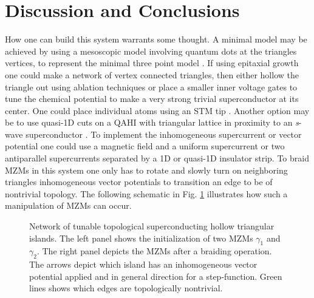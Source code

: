 \documentclass[aps,prb,showpacs,amsmath,amssymb,superscriptaddress]{revtex4-2}
\begin{document}
\section{Discussion and Conclusions}

How one can build this system warrants some thought.
A minimal model may be achieved by using a mesoscopic model involving quantum dots at the triangles vertices, to represent the minimal three point model \cite{dvirRealizationMinimalKitaev2023}.
If using epitaxial growth \cite{pietzschSpinResolvedElectronicStructure2006} one could make a network of vertex connected triangles, then either hollow the triangle out using ablation techniques or place a smaller inner voltage gates to tune the chemical potential to make a very strong trivial superconductor at its center.
One could place individual atoms using an STM tip \cite{schneiderPrecursorsMajoranaModes2022}.
Another option may be to use quasi-1D cuts on a QAHI with triangular lattice in proximity to an \textit{s}-wave superconductor \cite{xieCreatingLocalizedMajorana2021}.
To implement the inhomogeneous supercurrent or vector potential one could use a magnetic field and a uniform supercurrent or two antiparallel supercurrents separated by a 1D or quasi-1D insulator strip.
To braid MZMs in this system one only has to rotate and slowly turn on neighboring triangles inhomogeneous vector potentials to transition an edge to be of nontrivial topology.
The following schematic in Fig. \ref{fig: triangular-network-braiding} illustrates how such a manipulation of MZMs can occur.

\begin{figure}[]
  \caption{Network of tunable topological superconducting hollow triangular islands. The left panel shows the initialization of two MZMs $\gamma_1$ and $\gamma_2$. The right panel depicts the MZMs after a braiding operation. The arrows depict which island has an inhomogeneous vector potential applied and in general direction for a step-function. Green lines shows which edges are topologically nontrivial.}
  \label{fig: triangular-network-braiding}
\end{figure}
\end{document}
